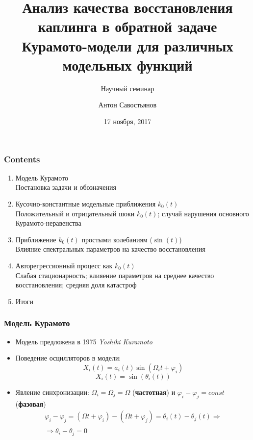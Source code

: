 \documentclass{beamer}
\title{Анализ качества восстановления каплинга в обратной задаче Курамото-модели для различных модельных функций}
\subtitle{Научный семинар}
\author{Антон Савостьянов}
\date{17 ноября, 2017}
\begin{document}
	\setcounter{showProgressBar}{0}
	\setcounter{showSlideNumbers}{0}

	\frame{\titlepage}

	\begin{frame}
		\frametitle{Contents}
		\begin{enumerate}
			\item Модель Курамото \\ \textcolor{ExecusharesGrey}{\footnotesize\hspace{1em} Постановка задачи и обозначения}
			\item Кусочно-константные модельные приближения $k_0(t)$ \\ \textcolor{ExecusharesGrey}{\footnotesize\hspace{1em} 
				Положительный и отрицательный шоки $k_0(t)$; случай нарушения основного Курамото-неравенства
			}
			\item Приближение $k_0(t)$ простыми колебаниям ($\sin(t)$) \\ \textcolor{ExecusharesGrey}{\footnotesize\hspace{1em} Влияние спектральных параметров на качество восстановления}
			\item Авторегрессионный процесс как $k_0(t)$ \\ \textcolor{ExecusharesGrey}{\footnotesize\hspace{1em} Слабая стационарность; влияение параметров на среднее качество восстановления; средняя доля катастроф}
			\item Итоги
		\end{enumerate}
	\end{frame}

	\setcounter{framenumber}{0}
	\setcounter{showProgressBar}{1}
	\setcounter{showSlideNumbers}{1}
	
\begin{frame}
	\frametitle{Модель Курамото}
	\begin{itemize}
		\item Модель предложена в 1975 \textit{Yoshiki Kuramoto}
		\item Поведение осцилляторов в модели:
		\[
		X_i(t)=a_i(t)\sin\left( \Omega_i t + \varphi_i \right)
		\]
		\[
		X_i(t)=\sin\left(\theta_i(t)\right)
		\]
		\item Явление синхронизации: $\Omega_i=\Omega_j=\Omega$ (\textbf{частотная}) и $\varphi_i-\varphi_j=const$ (\textbf{фазовая})
		\begin{multline*}
		\varphi_i-\varphi_j=\left( \Omega t + \varphi_i \right)-\left( \Omega t + \varphi_j \right)=\theta_i(t)-\theta_j(t) \Rightarrow \\
		\Rightarrow \dot{\theta_i}-\dot{\theta_j}=0
		\end{multline*}
	\end{itemize}
\end{frame}
\end{document}
